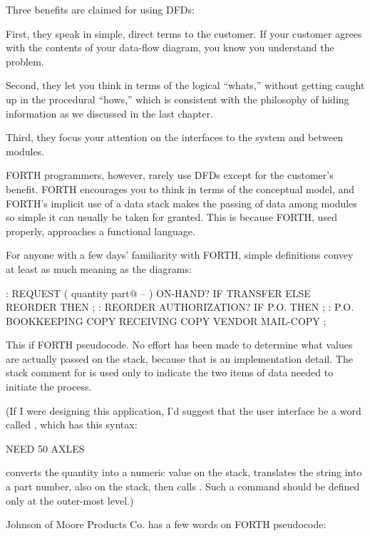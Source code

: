 
Three benefits are claimed for using DFDs:

First, they speak in simple, direct terms to the customer. If your
customer agrees with the contents of your data-flow diagram, you know
you understand the problem.

Second, they let you think in terms of the logical ``whats,'' without
getting caught up in the procedural ``hows,'' which is consistent with the
philosophy of hiding information as we discussed in the last chapter.

Third, they focus your attention on the interfaces to the system and
between modules.

FORTH programmers, however, rarely use DFDs except for the
customer's benefit. FORTH encourages you to think in terms of the
conceptual model, and FORTH's implicit use of a data stack makes the
passing of data among modules so simple it can usually be taken for granted.
This is because FORTH, used properly, approaches a functional
language.

For anyone with a few days' familiarity with FORTH, simple
definitions convey at least as much meaning as the diagrams:

\begin{Code}
: REQUEST ( quantity part@ -- )
   ON-HAND? IF TRANSFER ELSE REORDER THEN ;
: REORDER AUTHORIZATION? IF P.O. THEN ;
: P.O. BOOKKEEPING COPY RECEIVING COPY
   VENDOR MAIL-COPY ;
\end{Code}

This if FORTH pseudocode. No effort has been made to determine what
values are actually passed on the stack, because that is an
implementation detail. The stack comment for  is used
only to indicate the two items of data needed to initiate the process.

(If I were designing this application, I'd suggest that the user
interface be a word called , which has this syntax:

\begin{Code}
NEED 50 AXLES
\end{Code}

\noindent {} converts the quantity into a numeric value on
the stack, translates the string  into a part number,
also on the stack, then calls . Such a command should
be defined only at the outer-most level.)

\bigskip\blackline{2ex}
\noindent Johnson of Moore Products Co. has a few words on FORTH pseudocode:

